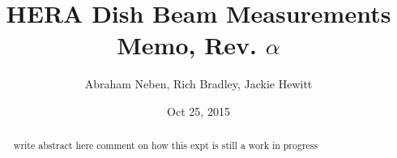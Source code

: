 \documentclass[preprint]{aastex}
\begin{document}
\title{HERA Dish Beam Measurements Memo, Rev. $\alpha$}


\author{Abraham Neben, Rich Bradley, Jackie Hewitt}

\author{Oct 25, 2015}



\begin{abstract}
write abstract here
comment on how this expt is still a work in progress
\end{abstract}





\end{document}
